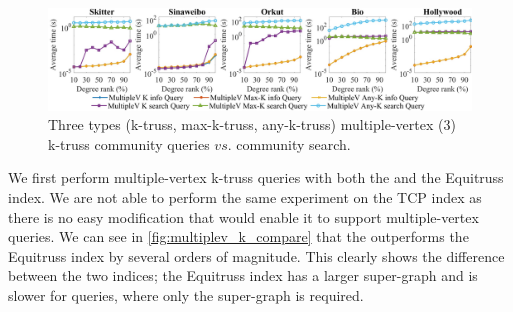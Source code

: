 \begin{figure}
    \centering
    \includegraphics[width=0.9\linewidth, trim={0cm 0cm, 0cm, 0cm}, clip]{./figures/multiplev_3_info_query_small.jpg}
		\vspace{-0.2cm}
    \caption{Three types (k-truss, max-k-truss, any-k-truss) multiple-vertex ($3$) \toplevelprob{} k-truss community queries $vs.$ community search.}
    \label{fig:multiplev_3_info_query}
		\vspace{-0.5cm}
\end{figure}



We first perform \toplevelprob{} multiple-vertex k-truss queries with both the \twolevelindex{} and the Equitruss index. We are not able to perform the same experiment on the TCP index as there is no easy modification that would enable it to support multiple-vertex queries. We can see in \autoref{fig:multiplev_k_compare} that the \twolevelindex{} outperforms the Equitruss index by several orders of magnitude. This clearly shows the difference between the two indices; the Equitruss index has a larger super-graph and is slower for \toplevelprob{} queries, where only the super-graph is required. %

